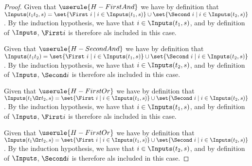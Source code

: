 \begin{proof}
       {Given that $\userule{H-FirstAnd}$ we have by definition that $\Inputs(t_1\And t_2,s) = \set{\First\ i \mid i \in \Inputs(t_1,s)} \cup \set{\Second\ i \mid i \in \Inputs(t_2,s)}$.
       By the induction hypothesis, we have that $i\in\Inputs(t_1,s)$, and by definition of $\Inputs$, $\First i$ is therefore als included in this case.}

       {Given that $\userule{H-SecondAnd}$ we have by definition that $\Inputs(t_1\And t_2) = \set{\First\ i \mid i \in \Inputs(t_1,s)} \cup \set{\Second\ i \mid i \in \Inputs(t_2,s)}$.
       By the induction hypothesis, we have that $i\in\Inputs(t_2,s)$, and by definition of $\Inputs$, $\Second i$ is therefore als included in this case.}

       {Given that $\userule{H-FirstOr}$ we have by definition that $\Inputs(t_1\Or t_2,s) = \set{\First\ i \mid i \in \Inputs(t_1,s)} \cup \set{\Second\ i \mid i \in \Inputs(t_2,s)}$.
       By the induction hypothesis, we have that $i\in\Inputs(t_1,s)$, and by definition of $\Inputs$, $\First i$ is therefore als included in this case.}

       {Given that $\userule{H-FirstOr}$ we have by definition that $\Inputs(t_1\Or t_2,s) = \set{\First\ i \mid i \in \Inputs(t_1,s)} \cup \set{\Second\ i \mid i \in \Inputs(t_2,s)}$.
       By the induction hypothesis, we have that $i\in\Inputs(t_2,s)$, and by definition of $\Inputs$, $\Second i$ is therefore als included in this case.}
\end{proof}
